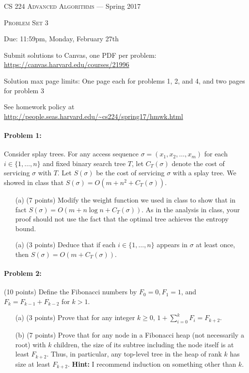 \documentclass[12pt]{article}
\begin{document}
\thispagestyle{empty}

\begin{center}
{\Large \textsc{CS 224 Advanced Algorithms} --- Spring 2017}

\bigskip

{\Large \textsc{Problem Set 3}}

\smallskip

Due: 11:59pm, Monday, February 27th

\medskip

Submit solutions to Canvas, one PDF per problem: \url{https://canvas.harvard.edu/courses/21996}

\medskip

Solution max page limits: One page each for problems 1, 2, and 4, and two pages for problem 3

\bigskip

{\footnotesize See homework policy at \url{http://people.seas.harvard.edu/~cs224/spring17/hmwk.html}}
\end{center}

\paragraph{Problem 1:}

Consider splay trees. For any access sequence $\sigma = (x_1,x_2,\ldots,x_m)$ for each $i\in\{1,\ldots,n\}$ and fixed binary search tree $T$, let $C_T(\sigma)$ denote the cost of servicing $\sigma$ with $T$. Let $S(\sigma)$ be the cost of servicing $\sigma$ with a splay tree. We showed in class that $S(\sigma) = O(m + n^2 + C_T(\sigma))$.
\begin{itemize}
\item[(a)] (7 points) Modify the weight function we used in class to show that in fact $S(\sigma) = O(m + n\log n + C_T(\sigma))$. As in the analysis in class, your proof should not use the fact that the optimal tree achieves the entropy bound.
\item[(a)] (3 points) Deduce that if each $i\in\{1,\ldots,n\}$ appears in $\sigma$ at least once, then $S(\sigma) = O(m + C_T(\sigma))$.
\end{itemize}

\paragraph{Problem 2:} (10 points) Define the Fibonacci numbers by $F_0 = 0, F_1 = 1$, and $F_k = F_{k-1} + F_{k-2}$ for $k > 1$.
\begin{itemize}
\item[(a)] (3 points) Prove that for any integer $k\ge 0$, $1 + \sum_{i=0}^k F_i = F_{k+2}$.
\item[(b)] (7 points) Prove that for any node in a Fibonacci heap (not necessarily a root) with $k$ children, the size of its subtree including the node itself is at least $F_{k+2}$. Thus, in particular, any top-level tree in the heap of rank $k$ has size at least $F_{k+2}$. \textbf{Hint:} I recommend induction on something other than $k$.
\end{itemize}
\end{document}
